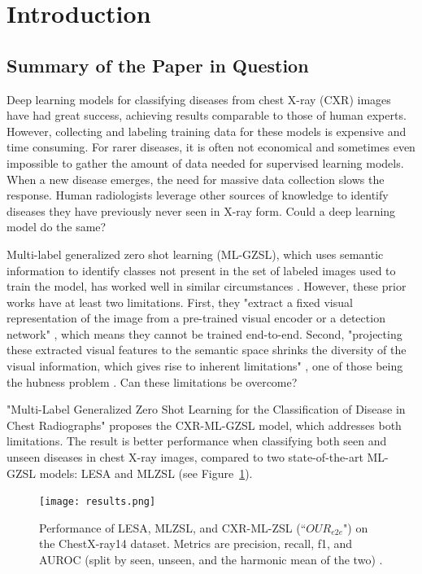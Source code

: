 \documentclass[letterpaper]{article} %
\begin{document}
\section{Introduction}

\subsection{Summary of the Paper in Question}

Deep learning models for classifying diseases from chest X-ray (CXR) images have had great success, achieving results comparable to those of human experts. However, collecting and labeling training data for these models is expensive and time consuming. For rarer diseases, it is often not economical and sometimes even impossible to gather the amount of data needed for supervised learning models. When a new disease emerges, the need for massive data collection slows the response. Human radiologists leverage other sources of knowledge to identify diseases they have previously never seen in X-ray form. Could a deep learning model do the same?

Multi-label generalized zero shot learning (ML-GZSL), which uses semantic information to identify classes not present in the set of labeled images used to train the model, has worked well in similar circumstances \cite{10.1109/TPAMI.2012.256, 10.1109/TMM.2019.2924511, 9157745}. However, these prior works have at least two limitations. First, they "extract a fixed visual representation of the image from a pre-trained visual encoder or a detection network" \cite{hayat2021multilabel}, which means they cannot be trained end-to-end. Second, "projecting these extracted visual features to the semantic space shrinks the diversity of the visual information, which gives rise to inherent limitations" \cite{hayat2021multilabel}, one of those being the hubness problem \cite{dinu2015improvingzeroshotlearningmitigating}. Can these limitations be overcome?

"Multi-Label Generalized Zero Shot Learning for the Classification of Disease in Chest Radiographs" \cite{hayat2021multilabel} proposes the CXR-ML-GZSL model, which addresses both limitations. The result is better performance when classifying both seen and unseen diseases in chest X-ray images, compared to two state-of-the-art ML-GZSL models: LESA \cite{9157745} and MLZSL \cite{lee2018multilabelzeroshotlearningstructured} (see Figure~\ref{fig:results}).

\begin{figure}[h!]
\centering
\texttt{[image: results.png]}
\caption{Performance of LESA, MLZSL, and CXR-ML-ZSL (``$OUR_{e2e}$") on the ChestX-ray14 dataset. Metrics are precision, recall, f1, and AUROC (split by seen, unseen, and the harmonic mean of the two) \cite{hayat2021multilabel}.}
\label{fig:results}
\end{figure}
\end{document}
